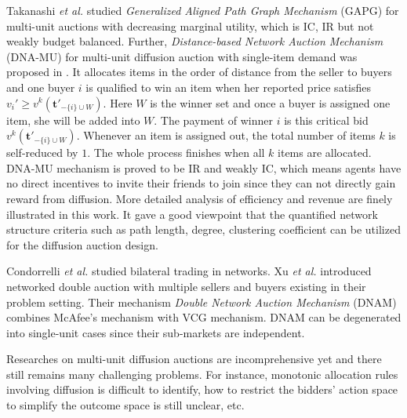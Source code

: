 \documentclass{article}
\begin{document}
Takanashi \emph{et al.}  studied \emph{Generalized Aligned Path Graph Mechanism} (GAPG) for multi-unit auctions with decreasing marginal utility, which is IC, IR but not weakly budget balanced.
Further, \emph{Distance-based Network Auction Mechanism} (DNA-MU) for multi-unit diffusion auction with single-item demand was proposed in \cite{kawasaki2020strategy}. It allocates items in the order of distance from the seller to buyers and one buyer $i$ is qualified to win an item when her reported price satisfies $v_i' \geq v^k(\mathbf{t}'_{-\{i\}\cup W})$. Here $W$ is the winner set and once a buyer is assigned one item, she will be added into $W$. The payment of winner $i$ is this critical bid $v^k(\mathbf{t}'_{-\{i\}\cup W})$. Whenever an item is assigned out, the total number of items $k$ is self-reduced by $1$. The whole process finishes when all $k$ items are allocated. DNA-MU mechanism is proved to be IR and weakly IC, which means agents have no direct incentives to invite their friends to join since they can not directly gain reward from diffusion. More detailed analysis of efficiency and revenue are finely illustrated in this work. It gave a good viewpoint that the quantified network structure criteria such as path length, degree, clustering coefficient can be utilized for the diffusion auction design.

Condorrelli \emph{et al.}  studied bilateral trading in networks. Xu \emph{et al.}  introduced networked double auction with multiple sellers and buyers existing in their problem setting. Their mechanism \emph{Double Network Auction Mechanism} (DNAM) combines McAfee's mechanism \cite{mcafee1993mechanism} with VCG mechanism. DNAM can be degenerated into single-unit cases since their sub-markets are independent.

Researches on multi-unit diffusion auctions are incomprehensive yet and there still remains many challenging problems. For instance, monotonic allocation rules involving diffusion is difficult to identify, how to restrict the bidders' action space to simplify the outcome space is still unclear, etc.
\end{document}
